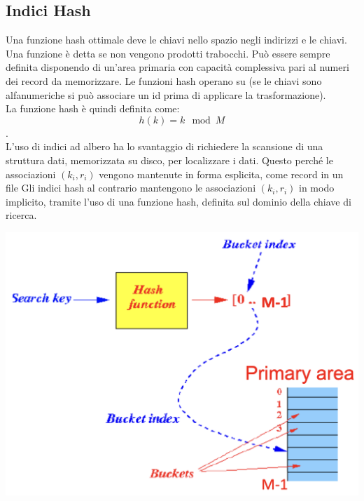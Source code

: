 \documentclass[12pt, a4paper]{report}
\begin{document}
    \subsection{Indici Hash}
    Una funzione hash ottimale deve  le chiavi nello spazio negli indirizzi e  le chiavi. Una funzione è detta  se non vengono prodotti trabocchi. Può essere sempre definita disponendo di un'area primaria con capacità complessiva pari al numeri dei record da memorizzare. Le funzioni hash operano su  (se le chiavi sono alfanumeriche si può associare un id prima di applicare la trasformazione).\\
    La funzione hash è quindi definita come:
    \begin{equation*}
        h(k) = k \mod M
    \end{equation*}
    .\\
    L’uso di indici ad albero ha lo svantaggio di richiedere la scansione di una struttura dati, memorizzata su disco, per localizzare i dati. Questo perché le associazioni $(k_{i}, r_{i})$ vengono mantenute in forma esplicita, come record in un file Gli indici hash al contrario mantengono le associazioni $(k_{i}, r_{i})$ in modo implicito, tramite l’uso di una funzione hash, definita sul dominio della chiave di ricerca.
    \begin{center}
        \includegraphics[scale=0.5]{Appunti Latex/Immagini/indicihashgen.png}
    \end{center}
\end{document}
